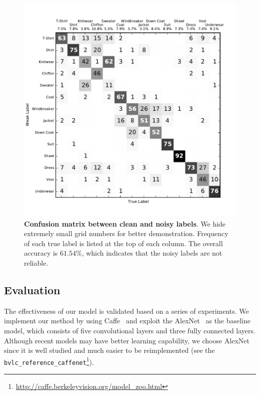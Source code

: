\documentclass[10pt,twocolumn,letterpaper]{article}
\begin{document}
\begin{figure}[t]
\begin{center}
\includegraphics[width=1.0\linewidth]{figure/cm_strong_weak_labels.pdf}
\end{center}
\caption{\textbf{Confusion matrix between clean and noisy labels}. We hide extremely small grid numbers for better demonstration. Frequency of each true label is listed at the top of each column. The overall accuracy is $61.54\%$, which indicates that the noisy labels are not reliable.}
\label{fig:cm_strong_weak}
\end{figure}


\subsection{Evaluation} %
\label{sub:evaluation}
The effectiveness of our model is validated based on a series of experiments. We implement our method by using Caffe~\cite{jia2014caffe} and exploit the AlexNet~\cite{krizhevsky2012imagenet} as the baseline model, which consists of five convolutional layers and three fully connected layers. Although recent models may have better learning capability, we choose AlexNet since it is well studied and much easier to be reimplemented (see the \texttt{bvlc\_reference\_caffenet}\footnote{\url{http://caffe.berkeleyvision.org/model_zoo.html}}).
\end{document}
